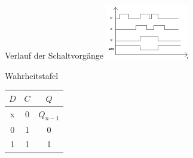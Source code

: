 \documentclass[compress,11pt]{beamer}
\begin{document}
\begin{frame}
\begin{block}{Verlauf der Schaltvorgänge}
\includegraphics[scale=1.3]{dlatch}
\end{block}
\end{frame}
\begin{frame}
\begin{block}{Wahrheitstafel}
\begin{tabular}{|c|c|c|}
\hline 
$D$ & $C$ & $Q$ \\ 
\hline 
x & 0 & $Q_{n-1}$ \\ 
\hline 
0 & 1 & 0 \\ 
\hline 
1 & 1 & 1 \\ 
\hline 
\end{tabular} 

\end{block}
\end{frame}
\end{document}
